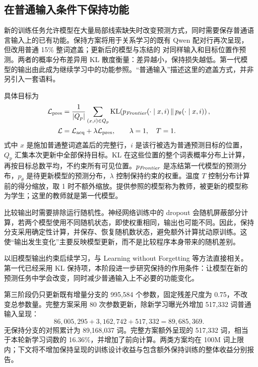 \subsection{在普通输入条件下保持功能}

新的训练任务允许模型在大量局部线索缺失时改变预测方式，同时需要保存普通语言输入上的已有功能。保持方案将用于关系学习的既有 Qwen 配对行再次呈现，但改用普通 15\% 整词遮盖；更新后的模型与冻结的 \Frontier{} 对同样输入和目标位置作预测。两者的概率分布差异用 KL 散度衡量：差异越小，保持损失越低。第一代模型的输出由此成为继续学习中的功能参照。“普通输入”描述这里的遮盖方式，并非另引入一套语料。

具体目标为
\begin{align}
 \mathcal L_{\mathrm{pres}}
 &=\frac{1}{|Q_p|}\sum_{(x,i)\in Q_p}
   \operatorname{KL}\!\left(p_{\textit{Frontier}}(\cdot\mid x,i)\,\|\,p_\theta(\cdot\mid x,i)\right),\\
 \mathcal L&=\mathcal L_{\mathrm{acq}}+\lambda\mathcal L_{\mathrm{pres}},
 \qquad\lambda=1,\quad T=1.
\label{eq:preservation}
\end{align}
式中 $x$ 是施加普通整词遮盖后的完整行，$i$ 是该行被选为普通预测目标的位置，$Q_p$ 汇集本次更新中全部保持目标。KL 在这些位置的整个词表概率分布上计算，再按目标总数平均，不约束所有可见位置。$p_{\textit{Frontier}}$ 是冻结第一代模型的预测分布，$p_\theta$ 是待更新模型的预测分布，$\lambda$ 控制保持约束的权重。温度 $T$ 控制分布计算前的得分缩放，取 1 时不额外缩放。提供参照的模型称为教师，被更新的模型称为学生；这里的教师就是第一代模型。

比较输出时需要排除运行随机性。神经网络训练中的 dropout 会随机屏蔽部分计算，若两个模型使用不同随机状态，即使权重相同，输出也可能不同。因此，保持分支采用确定性计算，并保存、恢复随机数状态，避免额外计算扰动原训练。这使“输出发生变化”主要反映模型更新，而不是比较程序本身带来的随机差别。

以旧模型输出约束后续学习，与 Learning without Forgetting 等方法直接相关\citep{li2016learning}。第一代已经采用 KL 保持项，本阶段进一步研究保持的作用条件：让模型在新的预测任务中学会改变，同时减少普通输入上不必要的功能变化。

第三阶段仍只更新既有增量分支的 995,584 个参数，固定残差尺度为 0.75，不改变总参数量。完整方案采用 80 次参数更新，除新学习曝光外增加 517,332 词普通输入呈现：
\begin{equation}
 86{,}005{,}295+3{,}162{,}742+517{,}332=89{,}685{,}369.
\label{eq:budget}
\end{equation}
无保持分支的对照累计为 89,168,037 词。完整方案额外呈现的 517,332 词，相当于本轮新学习词数的 16.36\%，并增加了前向计算。两类方案均在 100M 词上限内；下文将不增加保持呈现的训练设计收益与包含额外保持训练的整体收益分别报告。

